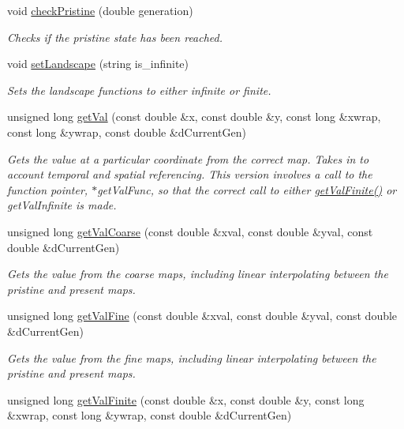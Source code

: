 \begin{DoxyCompactItemize}
\item 
void \hyperlink{class_map_af7067d6d076eb10b735dc08750dbf924}{check\+Pristine} (double generation)
\begin{DoxyCompactList}\small\item\em Checks if the pristine state has been reached. \end{DoxyCompactList}\item 
void \hyperlink{class_map_acaff6d6881f7547b824cb1a9086f8094}{set\+Landscape} (string is\+\_\+infinite)
\begin{DoxyCompactList}\small\item\em Sets the landscape functions to either infinite or finite. \end{DoxyCompactList}\item 
unsigned long \hyperlink{class_map_a69bc2233f8b2495cb7f37a8dc123ef68}{get\+Val} (const double \&x, const double \&y, const long \&xwrap, const long \&ywrap, const double \&d\+Current\+Gen)
\begin{DoxyCompactList}\small\item\em Gets the value at a particular coordinate from the correct map. Takes in to account temporal and spatial referencing. This version involves a call to the function pointer, $\ast$get\+Val\+Func, so that the correct call to either \hyperlink{class_map_a67718998cacf879b7b4ea05a4c758f39}{get\+Val\+Finite()} or get\+Val\+Infinite is made. \end{DoxyCompactList}\item 
unsigned long \hyperlink{class_map_a5907934cd80f7c2703ab1535fab5d606}{get\+Val\+Coarse} (const double \&xval, const double \&yval, const double \&d\+Current\+Gen)
\begin{DoxyCompactList}\small\item\em Gets the value from the coarse maps, including linear interpolating between the pristine and present maps. \end{DoxyCompactList}\item 
unsigned long \hyperlink{class_map_a20854e36fbd48ebc0b6a98a9e2e7874c}{get\+Val\+Fine} (const double \&xval, const double \&yval, const double \&d\+Current\+Gen)
\begin{DoxyCompactList}\small\item\em Gets the value from the fine maps, including linear interpolating between the pristine and present maps. \end{DoxyCompactList}\item 
unsigned long \hyperlink{class_map_a67718998cacf879b7b4ea05a4c758f39}{get\+Val\+Finite} (const double \&x, const double \&y, const long \&xwrap, const long \&ywrap, const double \&d\+Current\+Gen)

\end{DoxyCompactItemize}
